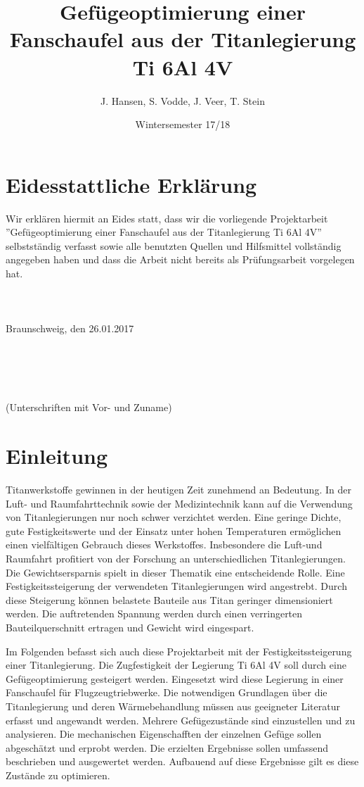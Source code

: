 \documentclass[a4paper, 11pt]{tubsreprt}
\title{Gefügeoptimierung einer Fanschaufel aus der Titanlegierung Ti 6Al 4V}
\date{Wintersemester 17/18}
\author{J. Hansen, S. Vodde,
 J. Veer, T. Stein}
\begin{document}
\maketitle
\newpage
\chapter*{Eidesstattliche Erklärung}

Wir erklären hiermit an Eides statt, dass wir die vorliegende Projektarbeit ''Gefügeoptimierung einer Fanschaufel aus der Titanlegierung Ti 6Al 4V'' selbstständig verfasst sowie alle
benutzten Quellen und Hilfsmittel vollständig angegeben haben und dass die Arbeit nicht bereits als Prüfungsarbeit vorgelegen hat.\\

\ \\
\ \\
\ \\



Braunschweig, den 26.01.2017


\ \\
\ \\
\ \\
\ \\

(Unterschriften mit Vor- und Zuname) 
\tableofcontents
{}
\chapter*{Einleitung}
Titanwerkstoffe gewinnen in der heutigen Zeit zunehmend an Bedeutung. In der Luft- und Raumfahrttechnik sowie der Medizintechnik kann auf die Verwendung von Titanlegierungen nur noch schwer verzichtet werden. Eine geringe Dichte, gute Festigkeitswerte und der Einsatz unter hohen Temperaturen ermöglichen einen vielfältigen Gebrauch dieses Werkstoffes. Insbesondere die Luft-und Raumfahrt profitiert von der Forschung an unterschiedlichen Titanlegierungen. Die Gewichtsersparnis spielt in dieser Thematik eine entscheidende Rolle. Eine Festigkeitssteigerung der verwendeten Titanlegierungen wird angestrebt. Durch diese Steigerung können belastete Bauteile aus Titan geringer dimensioniert werden. Die auftretenden Spannung werden durch einen verringerten Bauteilquerschnitt ertragen und Gewicht wird eingespart. 
  
Im Folgenden befasst sich auch diese Projektarbeit mit der Festigkeitssteigerung einer Titanlegierung. Die Zugfestigkeit der Legierung Ti 6Al 4V soll durch eine Gefügeoptimierung gesteigert werden. Eingesetzt wird diese Legierung in einer Fanschaufel für Flugzeugtriebwerke. Die notwendigen Grundlagen über die Titanlegierung und deren Wärmebehandlung müssen aus geeigneter Literatur erfasst und angewandt werden. Mehrere Gefügezustände sind einzustellen und zu analysieren. Die mechanischen Eigenschafften der einzelnen Gefüge sollen abgeschätzt und erprobt werden. Die erzielten Ergebnisse sollen umfassend beschrieben und ausgewertet werden. Aufbauend auf diese Ergebnisse gilt es diese Zustände zu optimieren.  
 
\end{document}
